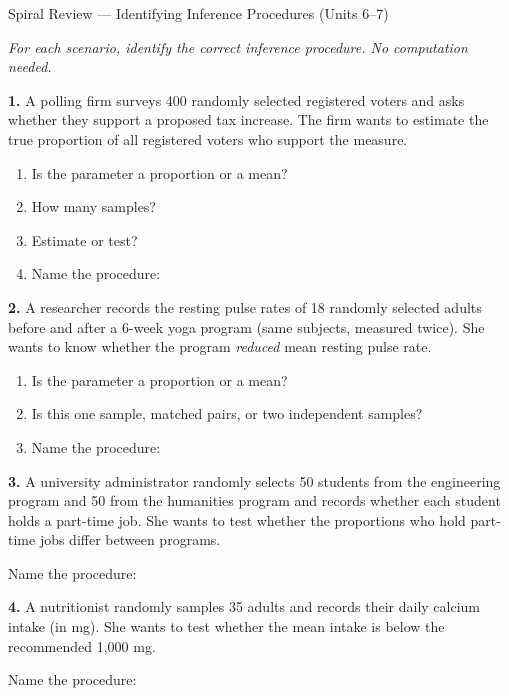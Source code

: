 \documentclass[10pt]{article}
\begin{document}
\namedateperiod

\vspace{0.12in}

\begin{notesbox}{Spiral Review --- Identifying Inference Procedures (Units 6--7)}

\textit{For each scenario, identify the correct inference procedure. No computation needed.}

\vspace{0.06in}
\textbf{1.} A polling firm surveys 400 randomly selected registered voters and asks whether
they support a proposed tax increase. The firm wants to estimate the true proportion of all
registered voters who support the measure.

\begin{enumerate}[label=\alph*.]
  \item Is the parameter a proportion or a mean? \blank{3cm}
  \item How many samples? \blank{3cm}
  \item Estimate or test? \blank{3cm}
  \item Name the procedure: \blank{8cm}
\end{enumerate}

\vspace{0.10in}
\textbf{2.} A researcher records the resting pulse rates of 18 randomly selected adults before
and after a 6-week yoga program (same subjects, measured twice). She wants to know whether the
program \emph{reduced} mean resting pulse rate.

\begin{enumerate}[label=\alph*.]
  \item Is the parameter a proportion or a mean? \blank{3cm}
  \item Is this one sample, matched pairs, or two independent samples? \blank{4cm}
  \item Name the procedure: \blank{8cm}
\end{enumerate}

\vspace{0.10in}
\textbf{3.} A university administrator randomly selects 50 students from the engineering program
and 50 from the humanities program and records whether each student holds a part-time job. She
wants to test whether the proportions who hold part-time jobs differ between programs.

Name the procedure: \blank{9cm}

\vspace{0.10in}
\textbf{4.} A nutritionist randomly samples 35 adults and records their daily calcium intake
(in mg). She wants to test whether the mean intake is below the recommended 1,000 mg.

Name the procedure: \blank{9cm}

\end{notesbox}
\end{document}
